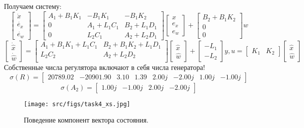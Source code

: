 Получаем систему:
\[
    \begin{bmatrix}
        \dot{x} \\
        \dot{e_x} \\
        \dot{e_w}
    \end{bmatrix} = 
    \begin{bmatrix}
        A_1 + B_1K_1 & -B_1K_1 & -B_1K_2 \\
        0 & A_1 + L_1C_1 & B_2 + L_1 D_1 \\
        0 & L_2 C_1 & A_2 + L_2 D_1
    \end{bmatrix}
    \begin{bmatrix}
        x \\
        e_x \\
        e_w
    \end{bmatrix} 
    + 
    \begin{bmatrix}
        B_2 + B_1 K_2 \\
        0 \\
        0
    \end{bmatrix} w
\]
\[
    \begin{bmatrix}
        \dot{\hat{x}} \\
        \dot{\hat{w}}
    \end{bmatrix} = 
    \begin{bmatrix}
        A_1 + B_1K_1 + L_1C_1 & B_2 + B_1K_2 + L_1D_1 \\
        L_2C_2 & A_2 + L_2D_2 \\
    \end{bmatrix}
    \begin{bmatrix}
        \hat{x} \\
        \hat{w}
    \end{bmatrix}
    +
    \begin{bmatrix}
        -L_1 \\ -L_2 
    \end{bmatrix}y, u = \begin{bmatrix}
        K_1 & K_2 
    \end{bmatrix}\begin{bmatrix}
        {\hat{x}} \\ {\hat{w}} 
    \end{bmatrix}
\]
Собственные числа регулятора включают в себя числа генератора!
\[\sigma (R) = \begin{bmatrix}
    20789.02 & -20901.90 &  3.10 &  1.39 &  2.00j &  -2.00j &  1.00j &  -1.00j
  \end{bmatrix}\]
  \[\sigma (A_2) = \begin{bmatrix}
    1.00j &  -1.00j &  2.00j &  -2.00j
  \end{bmatrix}\]
\begin{figure}[ht!]
    \centering
    \texttt{[image: src/figs/task4\_xs.jpg]}
    \caption{Поведение компонент вектора состояния.}
    \label{fig:task4_xs}
  \end{figure} 

